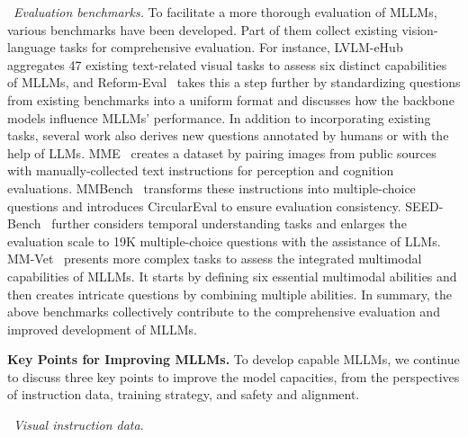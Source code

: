 \textbullet~\emph{Evaluation benchmarks.}  {To facilitate a more thorough evaluation of MLLMs, various benchmarks have been developed. Part of them collect existing vision-language tasks for comprehensive evaluation. For instance, LVLM-eHub~\cite{Xu-arxiv-2023-lvlm} aggregates 47 existing text-related visual tasks to assess six distinct capabilities of MLLMs, and Reform-Eval~\cite{Li-arxiv-2023-reform} takes this a step further by standardizing questions from existing benchmarks into a uniform format and discusses how the backbone models influence MLLMs' performance. In addition to incorporating existing tasks, several work also derives new questions annotated by humans or with the help of LLMs. MME~\cite{Fu-arxiv-2023-mme} creates a dataset by pairing images from public sources with manually-collected text instructions for perception and cognition evaluations. MMBench~\cite{Liu-arxiv-2023-mmbench} transforms these instructions into multiple-choice questions and introduces CircularEval to ensure evaluation consistency. SEED-Bench~\cite{Li-arxiv-2023-seed}  further considers temporal understanding tasks and enlarges the evaluation scale to 19K multiple-choice questions with the assistance of LLMs. MM-Vet~\cite{Yu-arxiv-2023-mmvet}  presents more complex tasks to assess the integrated multimodal capabilities of MLLMs. It starts by defining six essential multimodal abilities and then creates intricate questions by combining multiple abilities. In summary, the above benchmarks collectively contribute to the comprehensive evaluation and improved  development of MLLMs.}

\textbf{Key Points for Improving MLLMs.} To develop capable MLLMs, we continue to discuss three key points to improve the model capacities, from the perspectives of instruction data, training strategy, and safety and alignment.  

\textbullet~\emph{Visual instruction data}. 

